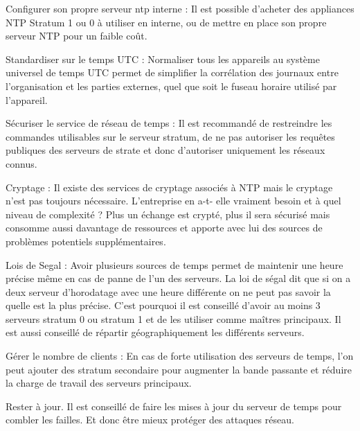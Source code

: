 \documentclass[a4paper]{article}
\begin{document}
\begin{adjustwidth}{-2cm}{-2cm}
Configurer son propre serveur ntp interne :
\newline
Il est possible d’acheter des appliances NTP Stratum 1 ou 0 à utiliser en interne, ou de mettre en place son propre serveur NTP pour un faible coût.
\newline

Standardiser sur le temps UTC :
\newline
Normaliser tous les appareils au système universel de temps UTC permet de simplifier la corrélation des journaux entre l’organisation et les parties externes, quel que soit le fuseau horaire utilisé par l’appareil.
\newline

Sécuriser le service de réseau de temps :
\newline
Il est recommandé de restreindre les commandes utilisables sur le serveur stratum, de ne pas autoriser les requêtes publiques des serveurs de strate et donc d’autoriser uniquement les réseaux connus.
\newline

Cryptage :
\newline
Il existe des services de cryptage associés à NTP mais le cryptage n’est pas toujours nécessaire. L’entreprise en a-t- elle vraiment besoin et à quel niveau de complexité ? Plus un échange est crypté, plus il sera sécurisé mais consomme aussi davantage de ressources et apporte avec lui des sources de problèmes potentiels supplémentaires.
\newline

Lois de Segal :
\newline
Avoir plusieurs sources de temps permet de maintenir une heure précise même en cas de panne de l’un des serveurs.
La loi de ségal dit que si on a deux serveur d’horodatage avec une heure différente on ne peut pas savoir la quelle est la plus précise. C’est pourquoi il est conseillé d’avoir au moins 3 serveurs stratum 0 ou stratum 1 et de les utiliser comme maîtres principaux. Il est aussi conseillé de répartir géographiquement les différents serveurs.
\newline

Gérer le nombre de clients :
\newline
En cas de forte utilisation des serveurs de temps, l’on peut ajouter des stratum secondaire pour augmenter la bande passante et réduire la charge de travail des serveurs principaux.
\newline

Rester à jour.
\newline
Il est conseillé de faire les mises à jour du serveur de temps pour combler les failles. Et donc être mieux protéger des attaques réseau.


\end{adjustwidth}
\end{document}
